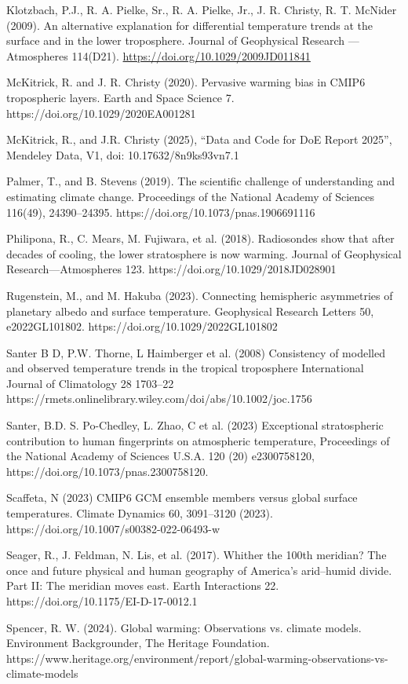 \documentclass[12pt,paper=a4,DIV=12,parskip=never,chapterprefix=false,headings=standardclasses]{scrreprt}
\begin{document}
Klotzbach, P.J., R. A. Pielke, Sr., R. A. Pielke, Jr., J. R. Christy, R. T. McNider (2009). An alternative
explanation for differential temperature trends at the surface and in the lower troposphere.
Journal of Geophysical Research — Atmospheres 114(D21).
\url{https://doi.org/10.1029/2009JD011841}

McKitrick, R. and J. R. Christy (2020). Pervasive warming bias in CMIP6 tropospheric layers. Earth and
Space Science 7. https://doi.org/10.1029/2020EA001281

McKitrick, R., and J.R. Christy (2025), “Data and Code for DoE Report 2025”, Mendeley Data, V1, doi:
10.17632/8n9ks93vn7.1

Palmer, T., and B. Stevens (2019). The scientific challenge of understanding and estimating climate
change. Proceedings of the National Academy of Sciences 116(49), 24390–24395.
https://doi.org/10.1073/pnas.1906691116

Philipona, R., C. Mears, M. Fujiwara, et al. (2018). Radiosondes show that after decades of cooling, the
lower stratosphere is now warming. Journal of Geophysical Research—Atmospheres 123.
https://doi.org/10.1029/2018JD028901

Rugenstein, M., and M. Hakuba (2023). Connecting hemispheric asymmetries of planetary albedo and
surface temperature. Geophysical Research Letters 50, e2022GL101802.
https://doi.org/10.1029/2022GL101802

Santer B D, P.W. Thorne, L Haimberger et al. (2008) Consistency of modelled and observed temperature
trends in the tropical troposphere International Journal of Climatology 28 1703–22
https://rmets.onlinelibrary.wiley.com/doi/abs/10.1002/joc.1756


Santer, B.D. S. Po-Chedley, L. Zhao, C et al. (2023) Exceptional stratospheric contribution to human
fingerprints on atmospheric temperature, Proceedings of the National Academy of Sciences U.S.A. 120
(20) e2300758120, https://doi.org/10.1073/pnas.2300758120.

Scaffeta, N (2023) CMIP6 GCM ensemble members versus global surface temperatures. Climate Dynamics
60, 3091–3120 (2023). https://doi.org/10.1007/s00382-022-06493-w

Seager, R., J. Feldman, N. Lis, et al. (2017). Whither the 100th meridian? The once and future physical
and human geography of America’s arid–humid divide. Part II: The meridian moves east. Earth
Interactions 22. https://doi.org/10.1175/EI-D-17-0012.1

Spencer, R. W. (2024). Global warming: Observations vs. climate models. Environment Backgrounder,
The Heritage Foundation.
https://www.heritage.org/environment/report/global-warming-observations-vs-climate-models
\end{document}
